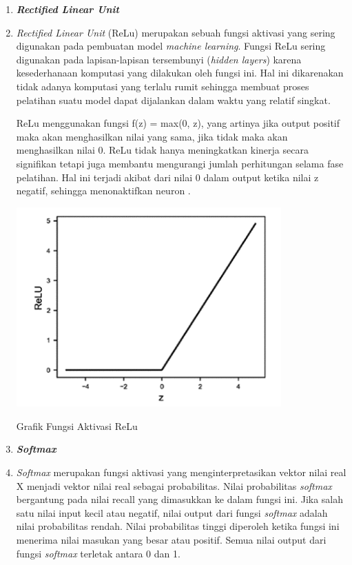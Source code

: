 \begin{enumerate}
    \item \textbf{\textit{Rectified Linear Unit}}
    \item[] \textit{Rectified Linear Unit} (ReLu) merupakan sebuah fungsi aktivasi yang sering digunakan pada pembuatan model \textit{machine learning}. Fungsi ReLu sering digunakan pada lapisan-lapisan tersembunyi (\textit{hidden layers}) karena kesederhanaan komputasi yang dilakukan oleh fungsi ini. Hal ini dikarenakan tidak adanya komputasi yang terlalu rumit sehingga membuat proses pelatihan suatu model dapat dijalankan dalam waktu yang relatif singkat.
    
    ReLu menggunakan fungsi f(z) = max(0, z), yang artinya jika output positif maka akan menghasilkan nilai yang sama, jika tidak maka akan menghasilkan nilai 0. ReLu tidak hanya meningkatkan kinerja secara signifikan tetapi juga membantu mengurangi jumlah perhitungan selama fase pelatihan. Hal ini terjadi akibat dari nilai 0 dalam output ketika nilai z negatif, sehingga menonaktifkan neuron \cite{moolayil2019}.
    \begin{afigure}
        \includegraphics[width=0.8\textwidth, center]{images/Picture2.png}
        \caption{Grafik Fungsi Aktivasi ReLu}
        \label{fig:relu} 
    \end{afigure}

    \item \textbf{\textit{Softmax}}
    \item[] \textit{Softmax} merupakan fungsi aktivasi yang menginterpretasikan vektor nilai real X menjadi vektor nilai real sebagai probabilitas. Nilai probabilitas \textit{softmax} bergantung pada nilai recall yang dimasukkan ke dalam fungsi ini. Jika salah satu nilai input kecil atau negatif, nilai output dari fungsi \textit{softmax} adalah nilai probabilitas rendah. Nilai probabilitas tinggi diperoleh ketika fungsi ini menerima nilai masukan yang besar atau positif. Semua nilai output dari fungsi \textit{softmax} terletak antara 0 dan 1. 


\end{enumerate}
